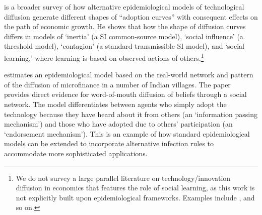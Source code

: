 \href{https://github.com/iworld1991/EpiExp/blob/master/Literature/young2009innovation.pdf}{\cite{young2009innovation}} is a broader survey of how alternative epidemiological models of technological diffusion generate different shapes of  ``adoption curves'' with consequent effects on the path of economic growth. He shows that how the shape of diffusion curves differs in models of `inertia' (a SI common-source model), `social influence' (a threshold model), `contagion' (a standard transmissible SI model), and `social learning,' where learning is based on observed actions of others.\footnote{We do not survey a large parallel literature on technology/innovation diffusion in economics that features the role of social learning, as this work is not explicitly built upon epidemiological frameworks. Examples  include  \href{https://www.researchgate.net/publication/222676428_Social_Learning_in_a_Heterogeneous_Population_Technology_Diffusion_in_the_Indian_Green_Revolution}{\cite{munshi2004social}},   \href{https://www.jstor.org/stable/41038754}{\cite{comin2010exploration}} and so on.}  %


\href{https://pubmed.ncbi.nlm.nih.gov/23888042/}{\cite{banerjee2013diffusion}} estimates an epidemiological model based on the real-world network and pattern of the diffusion of microfinance in a number of Indian villages. The paper provides direct evidence for word-of-mouth diffusion of beliefs through a social network. The model differentiates between agents who simply adopt the technology because they have heard about it from others (an `information passing mechanism') and those who have adopted due to others' participation (an `endorsement mechanism'). This is an example of how standard epidemiological models can be extended to incorporate alternative infection rules to accommodate more sophisticated applications.

